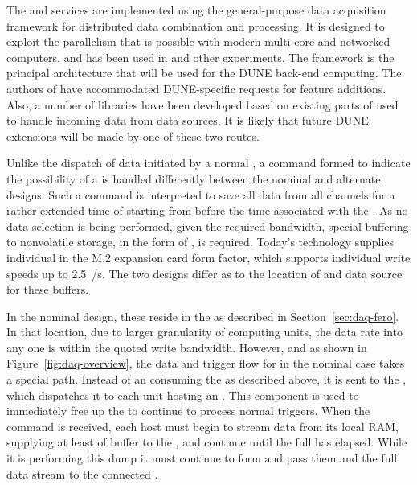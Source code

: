 The  and  services are implemented using
 the general-purpose \fnal data acquisition framework  for
distributed data combination and processing. 
It is designed to exploit the parallelism that is possible with
modern multi-core and networked computers, and has been used in  and other experiments.
The  framework is the principal architecture that will be used for the DUNE  back-end computing.
The authors of  have accommodated DUNE-specific 
requests for feature additions. Also, a number of libraries have been developed based on
existing parts of  used to handle incoming data from data
sources. 
It is likely that future DUNE extensions will be made by one of these two
routes.

Unlike the dispatch of data initiated by a normal ,
a command formed to indicate the possibility of a  is
handled differently between the nominal and alternate designs. 
Such a command is interpreted to save all data from all channels
for a rather extended time of \snbtime starting from \snbpretime
before the time associated with the . 
As no data selection is being performed, given the required bandwidth, special buffering to nonvolatile storage, in the form of , is required.  
Today's technology supplies individual  in the M.2 expansion card form factor,
which supports individual write speeds up to \SI{2.5}{\GB/\s}. 
The two designs differ as to the location of and data source for these
buffers.

In the nominal design, these  reside in the 
as described in Section~\ref{sec:daq-fero}. 
In that location, due to larger granularity of computing units, the
data rate into any one  is within the quoted write
bandwidth. 
However, and as shown in Figure~\ref{fig:daq-overview}, the data and
trigger flow for  in the nominal case takes a special
path. 
Instead of an  consuming the  as
described above, it is sent to the , which dispatches
it to each  unit hosting an . 
This component is used %
to immediately free up the 
to continue to process normal triggers.
When the command is received, each host must begin to stream data from
its local RAM, supplying at least \snbpretime of buffer to the
, and continue until the full \snbtime has elapsed. 
While it is performing this dump it must continue to form
 and pass them and the full data stream to the
connected .

